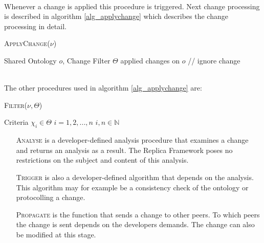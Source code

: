 \begin{figure}[h]
\begin{center}
{{                        }
                }
        \end{center}
        \label{img_changeprocessing}
\end{figure}\\
Whenever a change is applied this procedure is triggered. Next change
processing is described in algorithm \ref{alg_applychange} which
describes the change processing in detail.
\begin{algorithm}[h]                      %
\caption{\textsc{ApplyChange($\mathcal{\nu}$)}}          %
\label{alg_applychange}                           %
\begin{algorithmic}[h]                    %
\REQUIRE Shared Ontology $o$, Change Filter $\Theta$
        \RETURN applied changes on $o$
\ELSE
        \STATE // ignore change
\ENDIF
\end{algorithmic}
\end{algorithm}\\
The other procedures used in algorithm \ref{alg_applychange} are:
\begin{algorithm}[h]                      %
\caption{\textsc{Filter($\mathcal{\nu}, \Theta$)}}          %
\label{alg_filter}                           %
\begin{algorithmic}[h]                    %
\REQUIRE Criteria $\chi_i \in \Theta$\hspace{0,5cm} $i = 1,2,...,n$\hspace{0,5cm} $i,n \in \mathbb{N}$
                \RETURN \TRUE
        \ENDIF
\ENDFOR
\RETURN \FALSE
\end{algorithmic}
\end{algorithm}
\begin{itemize}
        \item[\textsc{Analyse}]  is a developer-defined analysis procedure that examines a change
        and returns an analysis as a result. The Replica Framework poses no
        restrictions on the subject and content of this analysis.
        \item[\textsc{Trigger}] is also a developer-defined algorithm that depends on the
        analysis. This algorithm may for example be a consistency check of
        the ontology or protocolling a change.
        \item[\textsc{Propagate}] is the function that sends a change to other peers.
        To which peers the change is sent depends on the developers demands.
        The change can also be modified at this stage.
\end{itemize}

